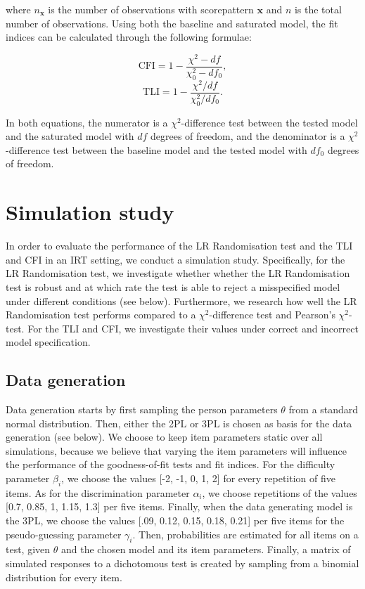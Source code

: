 \documentclass[Royal,sageapa,times,doublespace]{sagej}
\begin{document}
where $n_{\boldsymbol{x}}$ is the number of observations with scorepattern $\boldsymbol{x}$ and $n$ is the total number of observations. Using both the baseline and saturated model, the fit indices can be calculated through the following formulae:

\begin{equation}
\text{CFI} = 1 - \frac{\chi^{2} - df}{\chi^{2}_{0} - df_0},
\end{equation}
\begin{equation}
\text{TLI} = 1 - \frac{\chi^{2}/df}{\chi^{2}_{0}/df_0}.
\end{equation}

In both equations, the numerator is a $\chi^2$-difference test between the tested model and the saturated model with $df$ degrees of freedom, and the denominator is a $\chi^2$-difference test between the baseline model and the tested model with $df_0$ degrees of freedom.

\section{Simulation study}
In order to evaluate the performance of the LR Randomisation test and the TLI and CFI in an IRT setting, we conduct a simulation study. Specifically, for the LR Randomisation test, we investigate whether whether the LR Randomisation test is robust and at which rate the test is able to reject a misspecified model under different conditions (see below). Furthermore, we research how well the LR Randomisation test performs compared to a $\chi^2$-difference test and Pearson's $\chi^2$-test. For the TLI and CFI, we investigate their values under correct and incorrect model specification.
\subsection{Data generation}
Data generation starts by first sampling the person parameters $\theta$ from a standard normal distribution. Then, either the 2PL or 3PL is chosen as basis for the data generation (see below). We choose to keep item parameters static over all simulations, because we believe that varying the item parameters will influence the performance of the goodness-of-fit tests and fit indices. For the difficulty parameter $\beta_i$, we choose the values [-2, -1, 0, 1, 2] for every repetition of five items. As for the discrimination parameter $\alpha_i$, we choose repetitions of the values [0.7, 0.85, 1, 1.15, 1.3] per five items. Finally, when the data generating model is the 3PL, we choose the values [.09, 0.12, 0.15, 0.18, 0.21] per five items for the pseudo-guessing parameter $\gamma_i$. Then, probabilities are estimated for all items on a test, given $\theta$ and the chosen model and its item parameters. Finally, a matrix of simulated responses to a dichotomous test is created by sampling from a binomial distribution for every item. 
\end{document}
